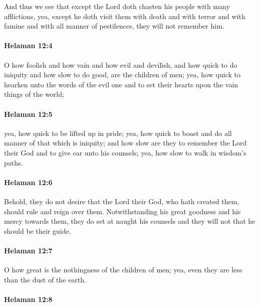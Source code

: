 			And thus we see that
			except the Lord doth chasten his people with many afflictions,
			yea, except he doth visit them with death and with terror
			and with famine and with all manner of pestilences,
			they will not remember him.

		\paragraph{Helaman 12:4} %
			\label{HELAMAN-12-4}

			O how foolish and how vain and how evil and devilish,
			and how quick to do iniquity and how slow to do good,
			are the children of men;
			yea, how quick to hearken unto the words of the evil one
			and to set their hearts upon the vain things of the world;

		\paragraph{Helaman 12:5} %
			\label{HELAMAN-12-5}

			yea, how quick to be lifted up in pride;
			yea, how quick to boast and do all manner of that which is iniquity;
			and how slow are they to remember the Lord their God
			and to give ear unto his counsels;
			yea, how slow to walk in wisdom's paths.

		\paragraph{Helaman 12:6} %
			\label{HELAMAN-12-6}

			Behold, they do not desire
			that the Lord their God, who hath created them, should rule and reign over them.
			Notwithstanding his great goodness and his mercy towards them,
			they do set at naught his counsels
			and they will not that he should be their guide.

		\paragraph{Helaman 12:7} %
			\label{HELAMAN-12-7}

			O how great is the nothingness of the children of men;
			yea, even they are less than the dust of the earth.

		\paragraph{Helaman 12:8} %
			\label{HELAMAN-12-8}

